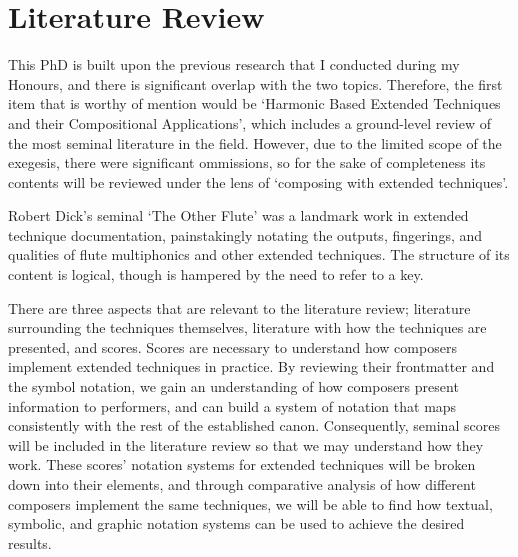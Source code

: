\section{Literature Review}
This PhD is built upon the previous research that I conducted during my Honours, and there is significant overlap with the two topics.
Therefore, the first item that is worthy of mention would be `Harmonic Based Extended Techniques and their Compositional Applications', which includes a ground-level review of the most seminal literature in the field.
However, due to the limited scope of the exegesis, there were significant ommissions, so for the sake of completeness its contents will be reviewed under the lens of `composing with extended techniques'.

Robert Dick's seminal `The Other Flute' was a landmark work in extended technique documentation, painstakingly notating the outputs, fingerings, and qualities of flute multiphonics and other extended techniques.\autocite{dickOtherFlute1989}
The structure of its content is logical, though is hampered by the need to refer to a key.

There are three aspects that are relevant to the literature review; literature surrounding the techniques themselves, literature with how the techniques are presented, and scores. 
Scores are necessary to understand how composers implement extended techniques in practice.
By reviewing their frontmatter and the symbol notation, we gain an understanding of how composers present information to performers, and can build a system of notation that maps consistently with the rest of the established canon.
Consequently, seminal scores will be included in the literature review so that we may understand how they work. 
These scores' notation systems for extended techniques will be broken down into their elements, and through comparative analysis of how different composers implement the same techniques, we will be able to find how textual, symbolic, and graphic notation systems can be used to achieve the desired results.
